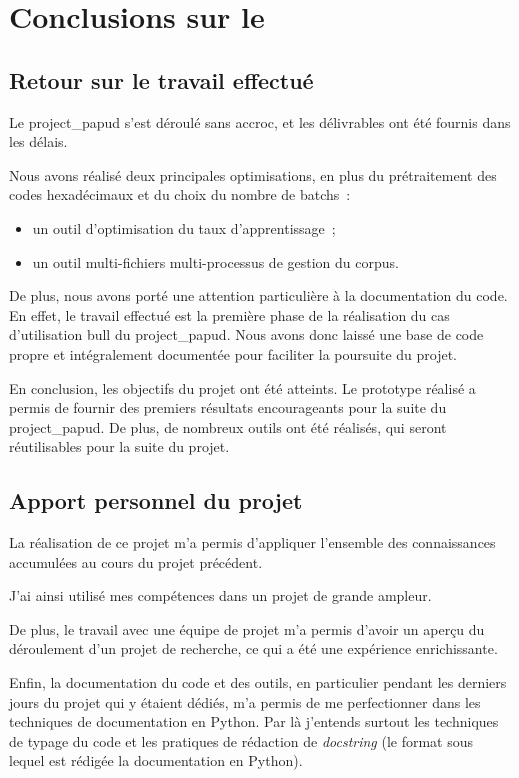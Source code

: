 \chapter{Conclusions sur le }

\section{Retour sur le travail effectué}
Le \gls{project_papud} s'est déroulé sans accroc, et les délivrables ont été fournis dans les délais.

Nous avons réalisé deux principales optimisations, en plus du prétraitement des codes hexadécimaux et du choix du nombre de \glspl{batch}~:
\begin{itemize}
	\item un outil d'optimisation du taux d'apprentissage~;
	\item un outil multi-fichiers multi-processus de gestion du corpus.
\end{itemize} %
\hspace{1em}

De plus, nous avons porté une attention particulière à la documentation du code.
En effet, le travail effectué est la première phase de la réalisation du cas d'utilisation \gls{bull} du \gls{project_papud}. Nous avons donc laissé une base de code propre et intégralement documentée pour faciliter la poursuite du projet.

En conclusion, les objectifs du projet ont été atteints. Le prototype réalisé a permis de fournir des premiers résultats encourageants pour la suite du \gls{project_papud}. De plus, de nombreux outils ont été réalisés, qui seront réutilisables pour la suite du projet.

\section{Apport personnel du projet}
La réalisation de ce projet m'a permis d'appliquer l'ensemble des connaissances accumulées au cours du projet précédent.

J'ai ainsi utilisé mes compétences dans un projet de grande ampleur.

De plus, le travail avec une équipe de projet m'a permis d'avoir un aperçu du déroulement d'un projet de recherche, ce qui a été une expérience enrichissante.

Enfin, la documentation du code et des outils, en particulier pendant les derniers jours du projet qui y étaient dédiés, m'a permis de me perfectionner dans les techniques de documentation en Python.
Par là j'entends surtout les techniques de typage du code \autocite{pep483,pep484} et les pratiques de rédaction de \textit{docstring} (le format sous lequel est rédigée la documentation en Python).

